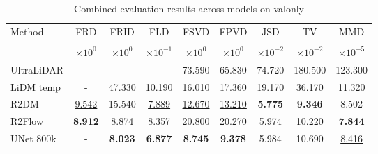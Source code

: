 \begin{table}[htbp]
\centering
\small
\begin{tabular}{lcccccccc}
\toprule
Method & FRD & FRID & FLD & FSVD & FPVD & JSD & TV & MMD \\ \\
 & $\times 10^{0}$ & $\times 10^{0}$ & $\times 10^{-1}$ & $\times 10^{0}$ & $\times 10^{0}$ & $\times 10^{-2}$ & $\times 10^{-2}$ & $\times 10^{-5}$ \\
\midrule
UltraLiDAR & - & - & - & 73.590 & 65.830 & 74.720 & 180.500 & 123.300 \\
\midrule
LiDM temp & - & 47.330 & 10.190 & 16.010 & 17.360 & 19.170 & 36.170 & 11.320 \\
\midrule
R2DM & \underline{9.542} & 15.540 & \underline{7.889} & \underline{12.670} & \underline{13.210} & \textbf{5.775} & \textbf{9.346} & 8.502 \\
\midrule
R2Flow & \textbf{8.912} & \underline{8.874} & 8.357 & 20.800 & 20.270 & \underline{5.974} & \underline{10.220} & \textbf{7.844} \\
\midrule
UNet 800k & - & \textbf{8.023} & \textbf{6.877} & \textbf{8.745} & \textbf{9.378} & 5.984 & 10.690 & \underline{8.416} \\
\bottomrule
\end{tabular}
\caption{Combined evaluation results across models on valonly}
\label{tab:combined_results}
\end{table}
